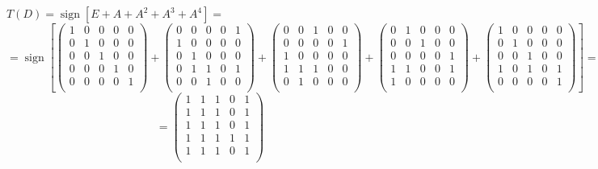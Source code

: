 \documentclass[fleqn]{article}
\DeclareMathOperator{\sign}{sign}
\begin{document}
$T(D)= \sign{[E + A + A^2 + A^3 + A^4]}=$
$$=\sign\left[\begin{pmatrix}
1 & 0 & 0 & 0 & 0\\
0 & 1 & 0 & 0 & 0\\
0 & 0 & 1 & 0 & 0\\
0 & 0 & 0 & 1 & 0\\
0 & 0 & 0 & 0 & 1\\
\end{pmatrix}
+
\begin{pmatrix}
0 & 0 & 0 & 0 & 1 \\
1 & 0 & 0 & 0 & 0 \\
0 & 1 & 0 & 0 & 0 \\
0 & 1 & 1 & 0 & 1 \\
0 & 0 & 1 & 0 & 0 \\
\end{pmatrix}
+
\begin{pmatrix}
0 & 0 & 1 & 0 & 0 \\
0 & 0 & 0 & 0 & 1 \\
1 & 0 & 0 & 0 & 0 \\
1 & 1 & 1 & 0 & 0 \\
0 & 1 & 0 & 0 & 0 \\
\end{pmatrix}
+
\begin{pmatrix}
0 & 1 & 0 & 0 & 0 \\
0 & 0 & 1 & 0 & 0 \\
0 & 0 & 0 & 0 & 1 \\
1 & 1 & 0 & 0 & 1 \\
1 & 0 & 0 & 0 & 0 \\
\end{pmatrix}
+
\begin{pmatrix}
1 & 0 & 0 & 0 & 0 \\
0 & 1 & 0 & 0 & 0 \\
0 & 0 & 1 & 0 & 0 \\
1 & 0 & 1 & 0 & 1 \\
0 & 0 & 0 & 0 & 1 \\
\end{pmatrix}\right]
=$$
$$=\begin{pmatrix}
1 & 1 & 1 & 0 & 1\\
1 & 1 & 1 & 0 & 1\\
1 & 1 & 1 & 0 & 1\\
1 & 1 & 1 & 1 & 1\\
1 & 1 & 1 & 0 & 1\\
\end{pmatrix}
$$
\end{document}
